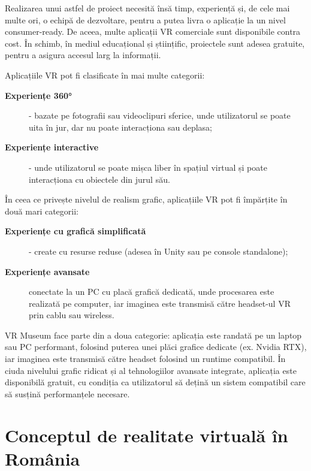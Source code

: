 Realizarea unui astfel de proiect necesită însă timp, experiență și, de cele mai multe ori, o echipă de dezvoltare, pentru a putea livra o aplicație la un nivel consumer-ready. De aceea, multe aplicații VR comerciale sunt disponibile contra cost. În schimb, în mediul educațional și științific, proiectele sunt adesea gratuite, pentru a asigura accesul larg la informații.

Aplicațiile VR pot fi clasificate în mai multe categorii:

\begin{adjustwidth}{2em}{0pt}
\begin{description}
    \item[\textbf{Experiențe 360°}] - bazate pe fotografii sau videoclipuri sferice, unde utilizatorul se poate uita în jur, dar nu poate interacționa sau deplasa;    
    \item[\textbf{Experiențe interactive}] - unde utilizatorul se poate mișca liber în spațiul virtual și poate interacționa cu obiectele din jurul său.
\end{description}
\end{adjustwidth}

\noindent În ceea ce privește nivelul de realism grafic, aplicațiile VR pot fi împărțite în două mari categorii:

\begin{adjustwidth}{2em}{0pt}
\begin{description}
    \item[\textbf{Experiențe cu grafică simplificată}] - create cu resurse reduse (adesea în Unity sau pe console standalone);   
    \item[\textbf{Experiențe avansate}] conectate la un PC cu placă grafică dedicată, unde procesarea este realizată pe computer, iar imaginea este transmisă către headset-ul VR prin cablu sau wireless.
\end{description}
\end{adjustwidth}

\noindent VR Museum face parte din a doua categorie: aplicația este randată pe un laptop sau PC performant, folosind puterea unei plăci grafice dedicate (ex. Nvidia RTX), iar imaginea este transmisă către headset folosind un runtime compatibil. În ciuda nivelului grafic ridicat și al tehnologiilor avansate integrate, aplicația este disponibilă gratuit, cu condiția ca utilizatorul să dețină un sistem compatibil care să susțină performanțele necesare.

\section{Conceptul de realitate virtuală în România}

